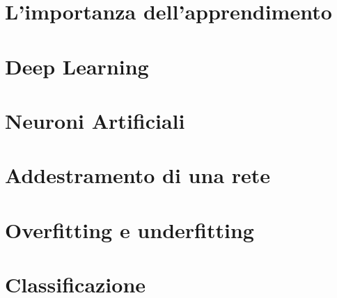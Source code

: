 \section{L'importanza dell'apprendimento}
\section{Deep Learning}
\section{Neuroni Artificiali}
\section{Addestramento di una rete}
\section{Overfitting e underfitting}
\section{Classificazione}



